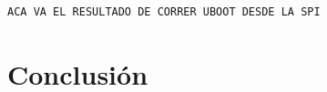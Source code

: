 \begin{lstlisting}[frame=single,caption={Salida de la ejecución del programa de prueba ejecutado en Linux Embebido},label={lst:salidalinux}]
 ACA VA EL RESULTADO DE CORRER UBOOT DESDE LA SPI
\end{lstlisting}		
		
		\section{Conclusión}
